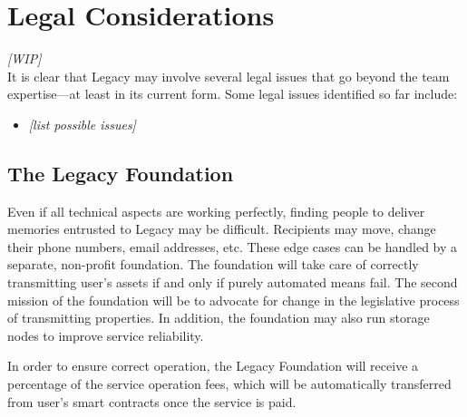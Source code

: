 \chapter{Legal Considerations} %
\label{cha:legal_considerations}

\textit{[WIP]}
\\
It is clear that Legacy may involve several legal issues that go beyond the team expertise---at least in its current form. Some legal issues identified so far include:

\begin{itemize}
	\item \textit{[list possible issues]}
\end{itemize}


\section{The Legacy Foundation} %
\label{sec:the_legacy_foundation}

Even if all technical aspects are working perfectly, finding people to deliver memories entrusted to Legacy may be difficult. Recipients may move, change their phone numbers, email addresses, etc. These edge cases can be handled by a separate, non-profit foundation.
The foundation will take care of correctly transmitting user’s assets if and only if purely automated means fail. 
The second mission of the foundation will be to advocate for change in the legislative process of transmitting properties.
In addition, the foundation may also run storage nodes to improve service reliability.

In order to ensure correct operation, the Legacy Foundation will receive a percentage of the service operation fees, which will be automatically transferred from user’s smart contracts once the service is paid.



